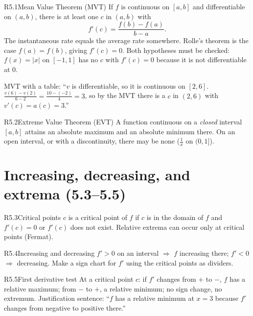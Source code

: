\documentclass{apcalc}
\begin{document}
\begin{rulebox}{R5.1}{Mean Value Theorem (MVT)}
If $f$ is continuous on $[a,b]$ and differentiable on $(a,b)$, there is at least one $c$ in $(a,b)$ with
\[f'(c)=\frac{f(b)-f(a)}{b-a}.\]
The instantaneous rate equals the average rate somewhere. Rolle's theorem is the case $f(a)=f(b)$, giving $f'(c)=0$. Both hypotheses must be checked: $f(x)=|x|$ on $[-1,1]$ has no $c$ with $f'(c)=0$ because it is not differentiable at 0.
\end{rulebox}

\begin{frqtip}
MVT with a table: ``$v$ is differentiable, so it is continuous on $[2,6]$. $\frac{v(6)-v(2)}{6-2}=\frac{10-(-2)}{4}=3$, so by the MVT there is a $c$ in $(2,6)$ with $v'(c)=a(c)=3$.''
\end{frqtip}

\begin{rulebox}{R5.2}{Extreme Value Theorem (EVT)}
A function continuous on a \emph{closed} interval $[a,b]$ attains an absolute maximum and an absolute minimum there. On an open interval, or with a discontinuity, there may be none ($\frac1x$ on $(0,1]$).
\end{rulebox}

\section{Increasing, decreasing, and extrema (5.3--5.5)}

\begin{rulebox}{R5.3}{Critical points}
$c$ is a critical point of $f$ if $c$ is in the domain of $f$ and $f'(c)=0$ or $f'(c)$ does not exist. Relative extrema can occur only at critical points (Fermat).
\end{rulebox}

\begin{rulebox}{R5.4}{Increasing and decreasing}
$f'>0$ on an interval $\Rightarrow$ $f$ increasing there; $f'<0$ $\Rightarrow$ decreasing. Make a sign chart for $f'$ using the critical points as dividers.
\end{rulebox}

\begin{rulebox}{R5.5}{First derivative test}
At a critical point $c$: if $f'$ changes from $+$ to $-$, $f$ has a relative maximum; from $-$ to $+$, a relative minimum; no sign change, no extremum. Justification sentence: ``$f$ has a relative minimum at $x=3$ because $f'$ changes from negative to positive there.''
\end{rulebox}
\end{document}
